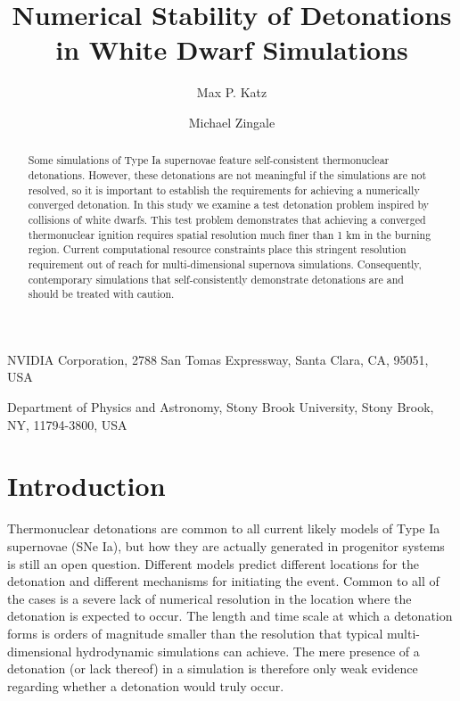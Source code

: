 \documentclass[twocolumn,numberedappendix,trackchanges]{aastex62}
\begin{document}
\title{Numerical Stability of Detonations in White Dwarf Simulations}


\author{Max P. Katz}
\affiliation
{
  NVIDIA Corporation, 2788 San Tomas Expressway, Santa Clara, CA, 95051, USA
}

\author{Michael Zingale}
\affiliation
{
  Department of Physics and Astronomy, Stony Brook University, Stony Brook, NY, 11794-3800, USA
}



\begin{abstract}
Some simulations of Type Ia supernovae feature self-consistent thermonuclear
detonations. However, these detonations are not meaningful if the simulations
are not resolved, so it is important to establish  the
requirements for achieving a numerically converged detonation. In this
study we examine a test detonation problem inspired by collisions of white dwarfs.
This test problem demonstrates that achieving a converged thermonuclear ignition
requires spatial resolution much finer than 1 km in the burning region.
Current computational resource constraints place this stringent resolution
requirement out of reach for multi-dimensional supernova simulations.
Consequently, contemporary simulations that self-consistently demonstrate
detonations are 
and should be treated with caution.
\end{abstract}

\section{Introduction}
\label{sec:introduction}

Thermonuclear detonations are common to all current likely models of Type Ia
supernovae (SNe Ia), but how they are actually generated in progenitor systems
is still an open question. Different models predict different locations for
the detonation and different mechanisms for initiating the event. Common to all
of the cases is a severe lack of numerical resolution in the location where the
detonation is expected to occur. The length and time scale at which a detonation
forms is orders of magnitude smaller than the resolution that typical multi-dimensional
hydrodynamic simulations can achieve. The mere presence of a detonation (or lack thereof)
in a simulation is therefore only weak evidence regarding whether a detonation would truly occur.
\end{document}
